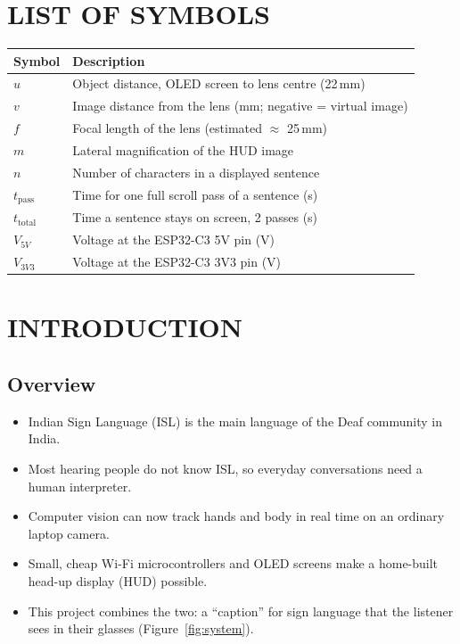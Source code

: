 \documentclass[12pt,a4paper]{report}
\begin{document}
\chapter*{LIST OF SYMBOLS}
\begin{center}
\begin{longtable}{L{3cm} L{9cm}}
\toprule
\textbf{Symbol} & \textbf{Description} \\
\midrule
\endhead
$u$ & Object distance, OLED screen to lens centre (22\,mm) \\
$v$ & Image distance from the lens (mm; negative = virtual image) \\
$f$ & Focal length of the lens (estimated $\approx$ 25\,mm) \\
$m$ & Lateral magnification of the HUD image \\
$n$ & Number of characters in a displayed sentence \\
$t_{\text{pass}}$ & Time for one full scroll pass of a sentence (s) \\
$t_{\text{total}}$ & Time a sentence stays on screen, 2 passes (s) \\
$V_{5V}$ & Voltage at the ESP32-C3 5V pin (V) \\
$V_{3V3}$ & Voltage at the ESP32-C3 3V3 pin (V) \\
\bottomrule
\end{longtable}
\end{center}

\clearpage
{}

\chapter{INTRODUCTION}

\section{Overview}
\begin{itemize}
  \item Indian Sign Language (ISL) is the main language of the Deaf community in India.
  \item Most hearing people do not know ISL, so everyday conversations need a human interpreter.
  \item Computer vision can now track hands and body in real time on an ordinary laptop camera.
  \item Small, cheap Wi-Fi microcontrollers and OLED screens make a home-built head-up display (HUD) possible.
  \item This project combines the two: a ``caption'' for sign language that the listener sees in their glasses (Figure~\ref{fig:system}).
\end{itemize}
\end{document}
